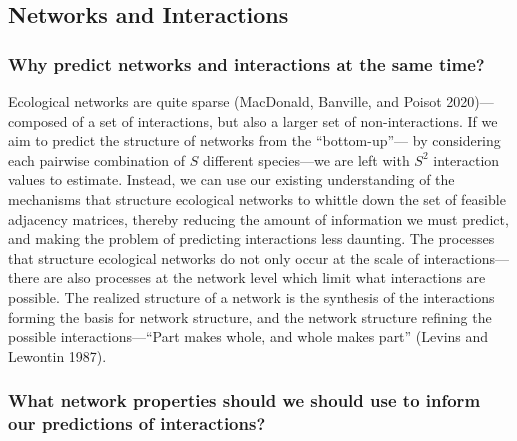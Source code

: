\documentclass[11pt]{article}
\begin{document}
\hypertarget{networks-and-interactions}{%
\subsection{Networks and Interactions}\label{networks-and-interactions}}

\hypertarget{why-predict-networks-and-interactions-at-the-same-time}{%
\subsubsection{Why predict networks and interactions at the same
time?}\label{why-predict-networks-and-interactions-at-the-same-time}}

Ecological networks are quite sparse (MacDonald, Banville, and Poisot
2020)---composed of a set of interactions, but also a larger set of
non-interactions. If we aim to predict the structure of networks from
the ``bottom-up''--- by considering each pairwise combination of \(S\)
different species---we are left with \(S^2\) interaction values to
estimate. Instead, we can use our existing understanding of the
mechanisms that structure ecological networks to whittle down the set of
feasible adjacency matrices, thereby reducing the amount of information
we must predict, and making the problem of predicting interactions less
daunting. The processes that structure ecological networks do not only
occur at the scale of interactions---there are also processes at the
network level which limit what interactions are possible. The realized
structure of a network is the synthesis of the interactions forming the
basis for network structure, and the network structure refining the
possible interactions---``Part makes whole, and whole makes part''
(Levins and Lewontin 1987).

\hypertarget{what-network-properties-should-we-should-use-to-inform-our-predictions-of-interactions}{%
\subsubsection{What network properties should we should use to inform
our predictions of
interactions?}\label{what-network-properties-should-we-should-use-to-inform-our-predictions-of-interactions}}
\end{document}
